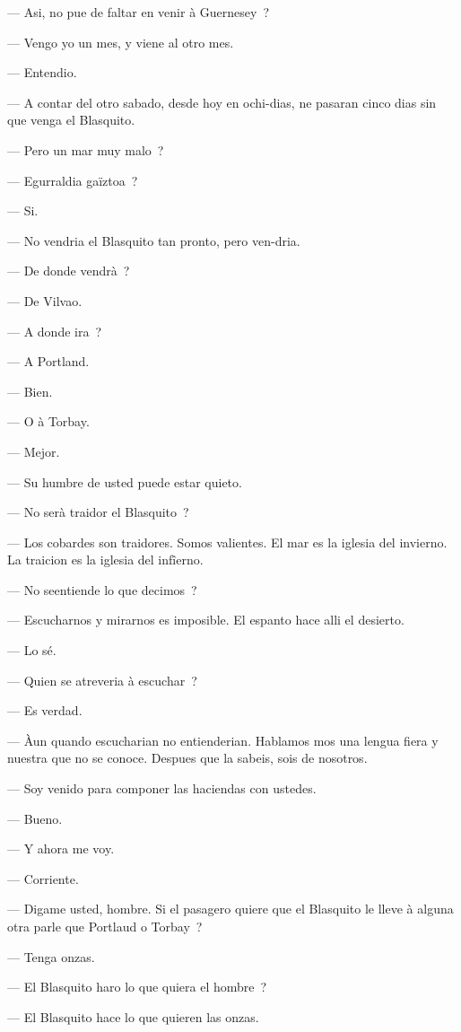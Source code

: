 \documentclass[french,twoside]{book} %
\begin{document}
— Asi, no pue de faltar en venir à Guernesey ?\par
— Vengo yo un mes, y viene al otro mes.\par
— Entendio.\par
— A contar del otro sabado, desde hoy en ochi-dias, ne pasaran cinco dias sin que venga el Blasquito.\par
— Pero un mar muy malo ?\par
— Egurraldia gaïztoa ?\par
— Si.\par
— No vendria el Blasquito tan pronto, pero ven-dria.\par
— De donde vendrà ?\par
— De Vilvao.\par
— A donde ira ?\par
 — A Portland.\par
— Bien.\par
— O à Torbay.\par
— Mejor.\par
— Su humbre de usted puede estar quieto.\par
— No serà traidor el Blasquito ?\par
— Los cobardes son traidores. Somos valientes. El mar es la iglesia del invierno. La traicion es la iglesia del infîerno.\par
— No seentiende lo que decimos ?\par
— Escucharnos y mirarnos es imposible. El espanto hace alli el desierto.\par
— Lo sé.\par
— Quien se atreveria à escuchar ?\par
— Es verdad.\par
— Àun quando escucharian no entienderian. Hablamos  mos una lengua fiera y nuestra que no se conoce. Despues que la sabeis, sois de nosotros.\par
— Soy venido para componer las haciendas con ustedes.\par
— Bueno.\par
— Y ahora me voy.\par
— Corriente.\par
— Digame usted, hombre. Si el pasagero quiere que el Blasquito le lleve à alguna otra parle que Portlaud o Torbay ?\par
— Tenga onzas.\par
— El Blasquito haro lo que quiera el hombre ?\par
— El Blasquito hace lo que quieren las onzas.\par
\end{document}
